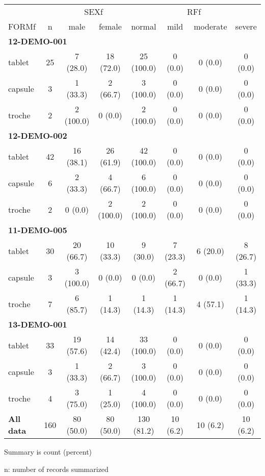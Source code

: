 \setlength{\tabcolsep}{5pt} 
\begin{threeparttable}
\renewcommand{\arraystretch}{1.3}
\begin{tabular}[h]{lccccccc}
\hline
\multicolumn{2}{c}{} & \multicolumn{2}{c}{SEXf} & \multicolumn{4}{c}{RFf} \\
\cmidrule(lr){3-4}
\cmidrule(lr){5-8}
FORMf & n & male & female & normal & mild & moderate & severe \\
\hline
\multicolumn{8}{l}{\textbf{12-DEMO-001}}\\
tablet & 25 & 7 (28.0) & 18 (72.0) & 25 (100.0) & 0 (0.0) & 0 (0.0) & 0 (0.0) \\
capsule & 3 & 1 (33.3) & 2 (66.7) & 3 (100.0) & 0 (0.0) & 0 (0.0) & 0 (0.0) \\
troche & 2 & 2 (100.0) & 0 (0.0) & 2 (100.0) & 0 (0.0) & 0 (0.0) & 0 (0.0) \\
\hline \multicolumn{8}{l}{\textbf{12-DEMO-002}}\\
tablet & 42 & 16 (38.1) & 26 (61.9) & 42 (100.0) & 0 (0.0) & 0 (0.0) & 0 (0.0) \\
capsule & 6 & 2 (33.3) & 4 (66.7) & 6 (100.0) & 0 (0.0) & 0 (0.0) & 0 (0.0) \\
troche & 2 & 0 (0.0) & 2 (100.0) & 2 (100.0) & 0 (0.0) & 0 (0.0) & 0 (0.0) \\
\hline \multicolumn{8}{l}{\textbf{11-DEMO-005}}\\
tablet & 30 & 20 (66.7) & 10 (33.3) & 9 (30.0) & 7 (23.3) & 6 (20.0) & 8 (26.7) \\
capsule & 3 & 3 (100.0) & 0 (0.0) & 0 (0.0) & 2 (66.7) & 0 (0.0) & 1 (33.3) \\
troche & 7 & 6 (85.7) & 1 (14.3) & 1 (14.3) & 1 (14.3) & 4 (57.1) & 1 (14.3) \\
\hline \multicolumn{8}{l}{\textbf{13-DEMO-001}}\\
tablet & 33 & 19 (57.6) & 14 (42.4) & 33 (100.0) & 0 (0.0) & 0 (0.0) & 0 (0.0) \\
capsule & 3 & 1 (33.3) & 2 (66.7) & 3 (100.0) & 0 (0.0) & 0 (0.0) & 0 (0.0) \\
troche & 4 & 3 (75.0) & 1 (25.0) & 4 (100.0) & 0 (0.0) & 0 (0.0) & 0 (0.0) \\
\hline \hline {\bf All data} & 160 & 80 (50.0) & 80 (50.0) & 130 (81.2) & 10 (6.2) & 10 (6.2) & 10 (6.2) \\
\hline
\end{tabular}
\begin{tablenotes}[flushleft]
\item Summary is count (percent)
\item n: number of records summarized
\end{tablenotes}
\end{threeparttable}
